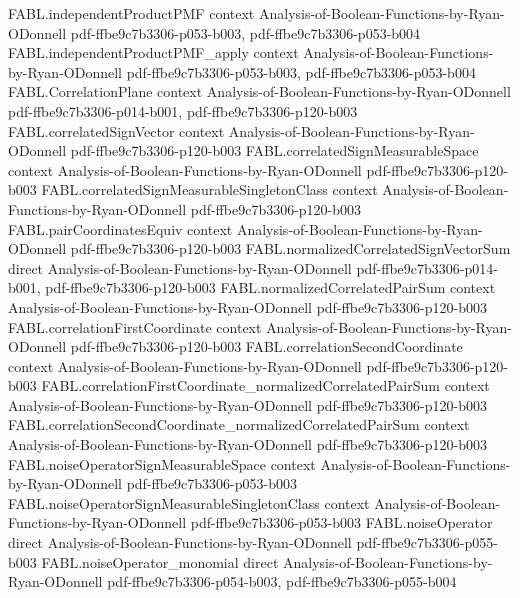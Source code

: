 \begin{theorem}
\proofstep
  {FABL.independentProductPMF}
  {context}
  {Analysis-of-Boolean-Functions-by-Ryan-ODonnell}
  {pdf-ffbe9c7b3306-p053-b003,
    pdf-ffbe9c7b3306-p053-b004}
\proofstep
  {FABL.independentProductPMF_apply}
  {context}
  {Analysis-of-Boolean-Functions-by-Ryan-ODonnell}
  {pdf-ffbe9c7b3306-p053-b003,
    pdf-ffbe9c7b3306-p053-b004}
\proofstep
  {FABL.CorrelationPlane}
  {context}
  {Analysis-of-Boolean-Functions-by-Ryan-ODonnell}
  {pdf-ffbe9c7b3306-p014-b001,
    pdf-ffbe9c7b3306-p120-b003}
\proofstep
  {FABL.correlatedSignVector}
  {context}
  {Analysis-of-Boolean-Functions-by-Ryan-ODonnell}
  {pdf-ffbe9c7b3306-p120-b003}
\proofstep
  {FABL.correlatedSignMeasurableSpace}
  {context}
  {Analysis-of-Boolean-Functions-by-Ryan-ODonnell}
  {pdf-ffbe9c7b3306-p120-b003}
\proofstep
  {FABL.correlatedSignMeasurableSingletonClass}
  {context}
  {Analysis-of-Boolean-Functions-by-Ryan-ODonnell}
  {pdf-ffbe9c7b3306-p120-b003}
\proofstep
  {FABL.pairCoordinatesEquiv}
  {context}
  {Analysis-of-Boolean-Functions-by-Ryan-ODonnell}
  {pdf-ffbe9c7b3306-p120-b003}
\proofstep
  {FABL.normalizedCorrelatedSignVectorSum}
  {direct}
  {Analysis-of-Boolean-Functions-by-Ryan-ODonnell}
  {pdf-ffbe9c7b3306-p014-b001,
    pdf-ffbe9c7b3306-p120-b003}
\proofstep
  {FABL.normalizedCorrelatedPairSum}
  {context}
  {Analysis-of-Boolean-Functions-by-Ryan-ODonnell}
  {pdf-ffbe9c7b3306-p120-b003}
\proofstep
  {FABL.correlationFirstCoordinate}
  {context}
  {Analysis-of-Boolean-Functions-by-Ryan-ODonnell}
  {pdf-ffbe9c7b3306-p120-b003}
\proofstep
  {FABL.correlationSecondCoordinate}
  {context}
  {Analysis-of-Boolean-Functions-by-Ryan-ODonnell}
  {pdf-ffbe9c7b3306-p120-b003}
\proofstep
  {FABL.correlationFirstCoordinate_normalizedCorrelatedPairSum}
  {context}
  {Analysis-of-Boolean-Functions-by-Ryan-ODonnell}
  {pdf-ffbe9c7b3306-p120-b003}
\proofstep
  {FABL.correlationSecondCoordinate_normalizedCorrelatedPairSum}
  {context}
  {Analysis-of-Boolean-Functions-by-Ryan-ODonnell}
  {pdf-ffbe9c7b3306-p120-b003}
\proofstep
  {FABL.noiseOperatorSignMeasurableSpace}
  {context}
  {Analysis-of-Boolean-Functions-by-Ryan-ODonnell}
  {pdf-ffbe9c7b3306-p053-b003}
\proofstep
  {FABL.noiseOperatorSignMeasurableSingletonClass}
  {context}
  {Analysis-of-Boolean-Functions-by-Ryan-ODonnell}
  {pdf-ffbe9c7b3306-p053-b003}
\proofstep
  {FABL.noiseOperator}
  {direct}
  {Analysis-of-Boolean-Functions-by-Ryan-ODonnell}
  {pdf-ffbe9c7b3306-p055-b003}
\proofstep
  {FABL.noiseOperator_monomial}
  {direct}
  {Analysis-of-Boolean-Functions-by-Ryan-ODonnell}
  {pdf-ffbe9c7b3306-p054-b003,
    pdf-ffbe9c7b3306-p055-b004}

\end{theorem}

